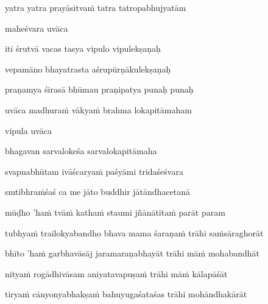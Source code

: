 yatra yatra prayāsitvaṁ tatra tatropabhujyatām \veg\dontdisplaylinenum
{}

maheśvara uvāca~{\dandab}\dontdisplaylinenum 

iti śrutvā vacas tasya vipulo vipulekṣaṇaḥ\thinspace{\danda} \dontdisplaylinenum

vepamāno bhayatrasta aśrupūrṇākulekṣaṇaḥ \veg\dontdisplaylinenum
{}

praṇamya śirasā bhūmau praṇipatya punaḥ punaḥ\thinspace{\dandab} \dontdisplaylinenum

uvāca madhuraṁ vākyaṁ brahma lokapitāmaham \veg\dontdisplaylinenum
{}

vipula uvāca~{\dandab}\dontdisplaylinenum 

bhagavan sarvalokeśa sarvalokapitāmaha\thinspace{\danda} \dontdisplaylinenum

svapnabhūtam ivāścaryaṁ paśyāmi tridaśeśvara \veg\dontdisplaylinenum

smtibhraṁśaś ca me jāto buddhir jātāndhacetanā\thinspace{\dandab} \dontdisplaylinenum

mūḍho 'haṁ tvāṁ kathaṁ staumi jñānātītaṁ parāt param \veg\dontdisplaylinenum
{}

\ujvers\nemsloka 
tubhyaṁ trailokyabandho bhava mama śaraṇaṁ trāhi saṁsāraghorāt
\dontdisplaylinenum

\nemslokab 
bhīto 'haṁ garbhavāsāj jaramaraṇabhayāt trāhi māṁ mohabandhāt \danda\dontdisplaylinenum

\nemslokac 
nityaṁ rogādhivāsam aniyatavapuṣaṁ trāhi māṁ kālapāśāt
\dontdisplaylinenum

\nemslokad 
tiryaṁ cānyonyabhakṣaṁ bahuyugaśataśas trāhi mohāndhakārāt \veg\dontdisplaylinenum
{}

